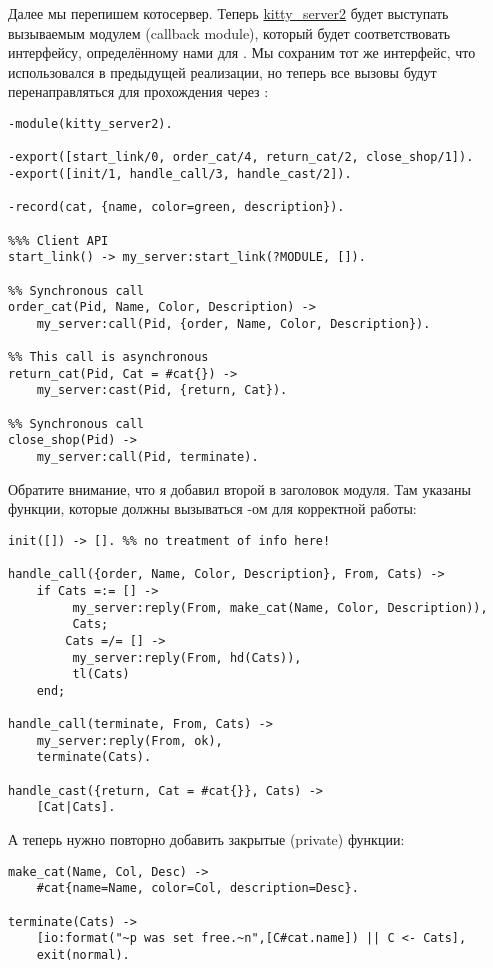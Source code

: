 Далее мы перепишем котосервер.
Теперь \href{http://learnyousomeerlang.com/static/erlang/kitty\_server2.erl}{kitty\_server2} будет выступать вызываемым модулем (callback module), который будет соответствовать интерфейсу, определённому нами для .
Мы сохраним тот же интерфейс, что использовался в предыдущей реализации, но теперь все вызовы будут перенаправляться для прохождения через :
\begin{lstlisting}[style=erlang]
-module(kitty_server2).
 
-export([start_link/0, order_cat/4, return_cat/2, close_shop/1]).
-export([init/1, handle_call/3, handle_cast/2]).
 
-record(cat, {name, color=green, description}).
 
%%% Client API
start_link() -> my_server:start_link(?MODULE, []).
 
%% Synchronous call
order_cat(Pid, Name, Color, Description) ->
    my_server:call(Pid, {order, Name, Color, Description}).
 
%% This call is asynchronous
return_cat(Pid, Cat = #cat{}) ->
    my_server:cast(Pid, {return, Cat}).
 
%% Synchronous call
close_shop(Pid) ->
    my_server:call(Pid, terminate).
\end{lstlisting}

Обратите внимание, что я добавил второй  в заголовок модуля.
Там указаны функции, которые должны вызываться \--ом для корректной работы:
\begin{lstlisting}[style=erlang]
%%% Server functions
init([]) -> []. %% no treatment of info here!
 
handle_call({order, Name, Color, Description}, From, Cats) ->
    if Cats =:= [] ->
         my_server:reply(From, make_cat(Name, Color, Description)),
         Cats;
        Cats =/= [] ->
         my_server:reply(From, hd(Cats)),
         tl(Cats)
    end;
 
handle_call(terminate, From, Cats) ->
    my_server:reply(From, ok),
    terminate(Cats).
 
handle_cast({return, Cat = #cat{}}, Cats) ->
    [Cat|Cats].
\end{lstlisting}

А теперь нужно повторно добавить закрытые (private) функции:
\begin{lstlisting}[style=erlang]
%%% Private functions
make_cat(Name, Col, Desc) ->
    #cat{name=Name, color=Col, description=Desc}.
 
terminate(Cats) ->
    [io:format("~p was set free.~n",[C#cat.name]) || C <- Cats],
    exit(normal).
\end{lstlisting}

